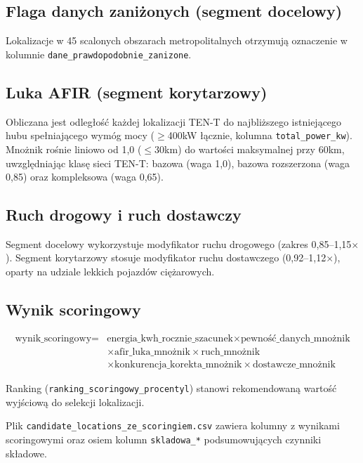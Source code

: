 \documentclass[11pt,a4paper]{article}
\begin{document}
	\subsection{Flaga danych zaniżonych (segment docelowy)}
	
	Lokalizacje w 45 scalonych obszarach metropolitalnych otrzymują oznaczenie w kolumnie \texttt{dane\_prawdopodobnie\_zanizone}.
	
	\subsection{Luka AFIR (segment korytarzowy)}
	
	Obliczana jest odległość każdej lokalizacji TEN-T do najbliższego istniejącego hubu spełniającego wymóg mocy ($\geq$400kW łącznie, kolumna \texttt{total\_power\_kw}). Mnożnik rośnie liniowo od 1,0 ($\leq$30km) do wartości maksymalnej przy 60km, uwzględniając klasę sieci TEN-T: bazowa (waga 1,0), bazowa rozszerzona (waga 0,85) oraz kompleksowa (waga 0,65).
	
	\subsection{Ruch drogowy i ruch dostawczy}
	
	Segment docelowy wykorzystuje modyfikator ruchu drogowego (zakres 0,85--1,15$\times$). Segment korytarzowy stosuje modyfikator ruchu dostawczego (0,92--1,12$\times$), oparty na udziale lekkich pojazdów ciężarowych.
	
	\subsection{Wynik scoringowy}
	
	\[
	\begin{aligned}
		\text{wynik\_scoringowy} = {} & \text{energia\_kwh\_rocznie\_szacunek} \times
		\text{pewność\_danych\_mnożnik} \\
		& \times \text{afir\_luka\_mnożnik} \times \text{ruch\_mnożnik} \\
		& \times \text{konkurencja\_korekta\_mnożnik} \times \text{dostawcze\_mnożnik}
	\end{aligned}
	\]
	
	Ranking (\texttt{ranking\_scoringowy\_procentyl}) stanowi rekomendowaną wartość wyjściową do selekcji lokalizacji.
	
	Plik \texttt{candidate\_locations\_ze\_scoringiem.csv} zawiera kolumny z wynikami scoringowymi oraz osiem kolumn \texttt{skladowa\_*} podsumowujących czynniki składowe.
	
\end{document}
